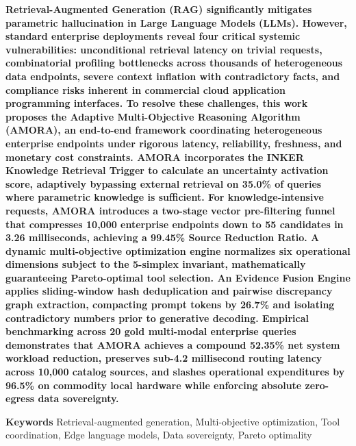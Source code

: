 \documentclass[fleqn,10pt]{article}
\begin{document}
\noindent\textbf{\textsf{Retrieval-Augmented Generation (RAG) significantly mitigates parametric hallucination in Large Language Models (LLMs). However, standard enterprise deployments reveal four critical systemic vulnerabilities: unconditional retrieval latency on trivial requests, combinatorial profiling bottlenecks across thousands of heterogeneous data endpoints, severe context inflation with contradictory facts, and compliance risks inherent in commercial cloud application programming interfaces. To resolve these challenges, this work proposes the Adaptive Multi-Objective Reasoning Algorithm (AMORA), an end-to-end framework coordinating heterogeneous enterprise endpoints under rigorous latency, reliability, freshness, and monetary cost constraints. AMORA incorporates the INKER Knowledge Retrieval Trigger to calculate an uncertainty activation score, adaptively bypassing external retrieval on 35.0\% of queries where parametric knowledge is sufficient. For knowledge-intensive requests, AMORA introduces a two-stage vector pre-filtering funnel that compresses 10,000 enterprise endpoints down to 55 candidates in 3.26 milliseconds, achieving a 99.45\% Source Reduction Ratio. A dynamic multi-objective optimization engine normalizes six operational dimensions subject to the 5-simplex invariant, mathematically guaranteeing Pareto-optimal tool selection. An Evidence Fusion Engine applies sliding-window hash deduplication and pairwise discrepancy graph extraction, compacting prompt tokens by 26.7\% and isolating contradictory numbers prior to generative decoding. Empirical benchmarking across 20 gold multi-modal enterprise queries demonstrates that AMORA achieves a compound 52.35\% net system workload reduction, preserves sub-4.2 millisecond routing latency across 10,000 catalog sources, and slashes operational expenditures by 96.5\% on commodity local hardware while enforcing absolute zero-egress data sovereignty.}}

\vspace{0.8em}
\noindent\textbf{\textsf{Keywords}} \textsf{Retrieval-augmented generation, Multi-objective optimization, Tool coordination, Edge language models, Data sovereignty, Pareto optimality}

\vspace{1.5em}
\vspace{1.2em}
\end{document}
